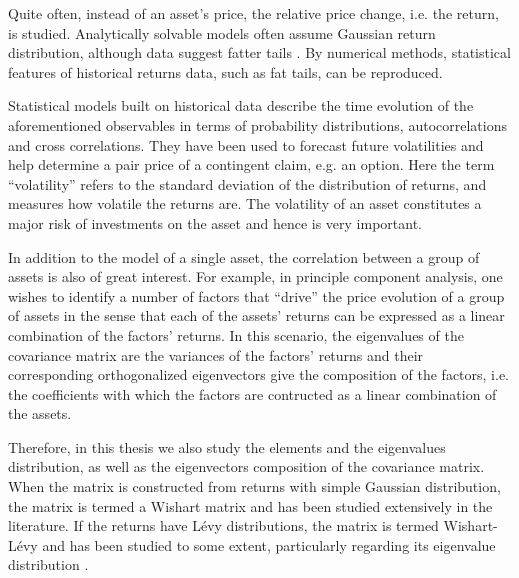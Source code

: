 \documentclass{report}
\begin{document}
Quite often, instead of an asset's price, the relative price change,
i.e. the return, is studied. Analytically solvable models often assume
Gaussian return distribution, although data suggest fatter tails
\footnotemark. By numerical methods, statistical features of
historical returns data, such as fat tails, can be reproduced.

Statistical models built on historical data describe the time
evolution of the aforementioned observables in terms of probability
distributions, autocorrelations and cross correlations. They have been
used to forecast future volatilities and help determine a pair price
of a contingent claim, e.g. an option. Here the term ``volatility''
refers to the standard deviation of the distribution of returns, and
measures how volatile the returns are. The volatility of an asset
constitutes a major risk of investments on the asset and hence is very
important.


In addition to the model of a single asset, the correlation between
a group of assets is also of great interest. For example, in principle
component analysis, one wishes to identify a number of factors that
``drive'' the price evolution of a group of assets in the sense that
each of the assets' returns can be expressed as a linear combination
of the factors' returns. In this scenario, the eigenvalues of the
covariance matrix are the variances of the factors' returns and their
corresponding orthogonalized eigenvectors give the composition of the
factors, i.e. the coefficients with which the factors are contructed
as a linear combination of the assets.

Therefore, in this thesis we also study the elements and the
eigenvalues distribution, as well as the eigenvectors composition of
the covariance matrix. When the matrix is constructed from returns
with simple Gaussian distribution, the matrix is termed a Wishart matrix
and has been studied extensively in the literature. If the returns
have L\'evy distributions, the matrix is termed Wishart-L\'evy and has
been studied to some extent, particularly regarding its eigenvalue
distribution \cite{politi2010}.
\end{document}
